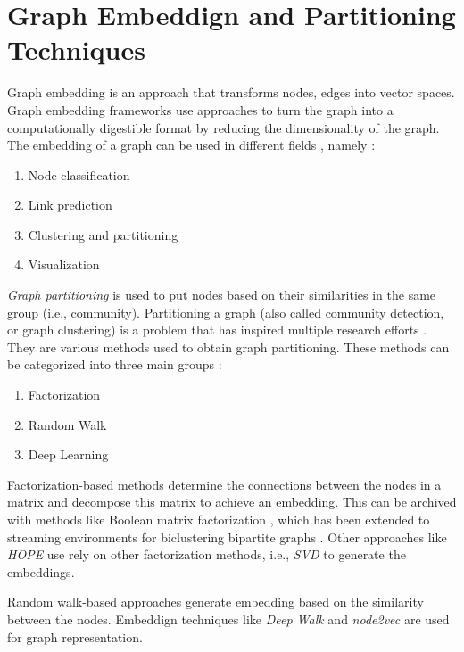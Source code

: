 \section{Graph Embeddign and Partitioning Techniques}
\label{sec:graph-partitioning-techniques}
Graph embedding is an approach that transforms nodes, edges into vector spaces. Graph embedding frameworks use approaches to turn the graph into a computationally digestible format by reducing the dimensionality of the graph. The embedding of a graph can be used in different fields \cite{goyalGraphEmbeddingTechniques2018}, namely : 

\begin{enumerate}
    \item Node classification
    \item Link prediction
    \item Clustering and partitioning
    \item Visualization
\end{enumerate}


\emph{Graph partitioning} is used to put nodes based on their similarities in the same group (i.e., community). Partitioning a graph (also called community detection, or graph clustering) is a problem that has inspired multiple research efforts \cite{fortunatoCommunityDetectionGraphs2010}. They are various methods used to obtain graph partitioning. These methods can be categorized into three main groups \cite{goyalGraphEmbeddingTechniques2018}:

\begin{enumerate}
    \item Factorization
    \item Random Walk
    \item Deep Learning
\end{enumerate}


Factorization-based methods determine the connections between the nodes in a matrix and decompose this matrix to achieve an embedding. This can be archived with methods like Boolean matrix factorization \cite{miettinenModelOrderSelection2011}, which has been extended to streaming environments for biclustering bipartite graphs \cite{neumannBiclusteringBooleanMatrix2020}. Other approaches like \emph{HOPE} \cite{ouAsymmetricTransitivityPreserving2016b} use rely on other factorization methods, i.e., \emph{SVD} \cite{vanloanGeneralizingSingularValue1976} to generate the embeddings.


Random walk-based approaches generate embedding based on the similarity between the nodes. Embeddign techniques like \emph{Deep Walk} \cite{perozziDeepWalkOnlineLearning2014} and \emph{node2vec} \cite{groverNode2vecScalableFeature2016} are used for graph representation.


